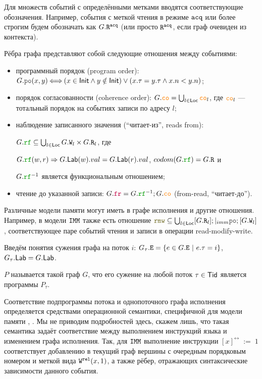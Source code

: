 Для множеств событий с определёнными метками вводятся соответствующие обозначения. Например, события с меткой чтения в режиме ${\mathtt{acq}}$ или более строгим будем обозначать как $G.{\mathtt{R}}^{{\mathtt{acq}}}$ (или просто ${\mathtt{R}}^{{\mathtt{acq}}}$, если граф очевиден из контекста).

Рёбра графа представляют собой следующие отношения между событиями:
\begin{itemize}
\item программный порядок (program order): $G.\lPO(x, y)\!\! \iff \!\! (x\in \Init \land y\notin \Init) \lor (x.\tau = y.\tau \land x.n<y.n)$;
\item порядок согласованности (coherence order): $G.\lCO = \bigcup_{l\in \Loc} \lCO_l$, где $\lCO_l$ --- тотальный порядок на событиях записи по адресу $l$;
\item наблюдение записанного значения (``читает-из'', reads from):

  $G.\lRF \subseteq \bigcup_{l\in \Loc} G.\lW_l \times G.\lR_l$, где

  $G.\lRF(w, r)\implies G.\Lab(w).val = G.\Lab(r).val$, $codom(G.\lRF) = G.\lR$ и

  $G.\lRF^{-1}$ является функциональным отношением;
\item чтение до указанной записи: $G.\lFR = G.\lRF^{-1}; G.\lCO$ (from-read, ``читает-\allowbreak до'').
\end{itemize}  

Различные модели памяти могут иметь в графе исполнения и другие отношения. Например, в модели $\mathtt{IMM}$ также есть отношение $\lRMW \subseteq \bigcup_{l\in \Loc}[G.\lR_l];\imm\lPO;[G.\lW_l]$, соответствующее паре событий чтения и записи в операции read-modify-write. 

Введём понятия сужения графа на поток $i$: $G_\tau.{\mathtt{E}} = \{e\in G.{\mathtt{E}}\ |\ e.\tau = i\}$, $G_\tau.\mathsf{Lab} = G.\mathsf{Lab}$.

\begin{defn}
  \label{def:execution}
 $P$ называется такой граф $G$, что его сужение на любой поток $\tau\in \mathsf{Tid}$ является  программы $P_\tau$.
\end{defn}

Соответствие подпрограммы потока и однопоточного графа исполнения определяется средствами операционной семантики, специфичной для модели памяти \cite{omm}, \cite{imm}. Мы не приводим подробностей здесь, скажем лишь, что такая семантика задаёт соответствие между выполнением инструкций языка и изменением графа исполнения. Так, для $\mathtt{IMM}$ выполнение инструкции $[x]^{\rel}\;:=\;1$ соответствует добавлению в текущий граф вершины с очередным порядковым номером и меткой вида ${\mathtt{W}}^{\mathtt{rel}}(x, 1)$, а также рёбер, отражающих синтаксические зависимости данного события.

